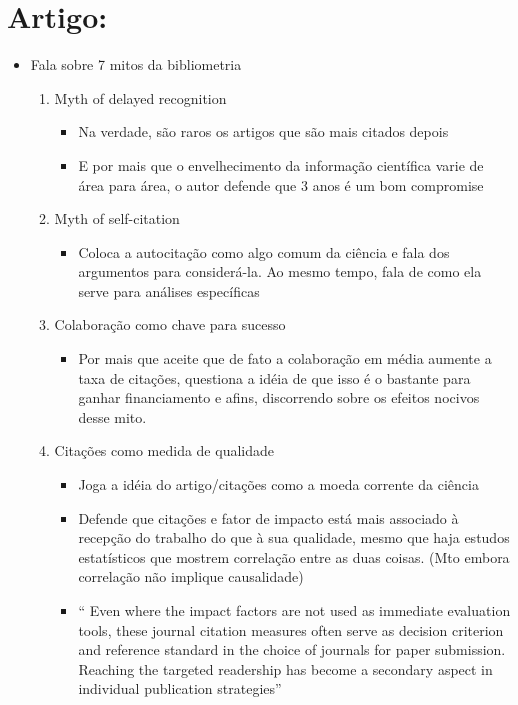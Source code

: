 \documentclass[11pt]{article}
\begin{document}
\section{Artigo: \cite{glanzel2008}}
\label{sec:orgb9cb586}
\begin{itemize}
\item Fala sobre 7 mitos da bibliometria
\begin{enumerate}
\item Myth of delayed recognition
\begin{itemize}
\item Na verdade, são raros os artigos que são mais citados depois
\item E por mais que o envelhecimento da informação científica varie de área para área, o autor defende que 3 anos é um bom compromise
\end{itemize}
\item Myth of self-citation
\begin{itemize}
\item Coloca a autocitação como algo comum da ciência e fala dos argumentos para considerá-la. Ao mesmo tempo, fala de como ela serve para análises específicas
\end{itemize}
\item Colaboração como chave para sucesso
\begin{itemize}
\item Por mais que aceite que de fato a colaboração em média aumente a taxa de citações, questiona a idéia de que isso é o bastante para ganhar financiamento e afins, discorrendo sobre os efeitos nocivos desse mito.
\end{itemize}
\item Citações como medida de qualidade
\begin{itemize}
\item Joga a idéia do artigo/citações como a moeda corrente da ciência
\item Defende que citações e fator de impacto está mais associado à recepção do trabalho do que à sua qualidade, mesmo que haja estudos estatísticos que mostrem correlação entre as duas coisas. (Mto embora correlação não implique causalidade)
\item `` Even where the impact factors are not used as immediate evaluation tools, these journal citation measures often serve as decision criterion and reference standard in the choice of journals for paper submission. Reaching the targeted readership has become a secondary aspect in individual publication strategies''
\end{itemize}

\end{enumerate}
\end{itemize}
\end{document}
